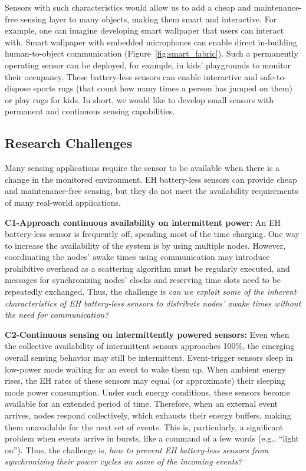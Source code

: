 Sensors with such characteristics would allow us to add a cheap and maintenance-free sensing layer to many objects, making them smart and interactive. For example, one can imagine developing smart wallpaper that users can interact with. 
Smart wallpaper with embedded microphones can enable direct in-building human-to-object communication (Figure~\ref{fig:smart_fabric}). Such a permanently operating sensor can be deployed, for example, in kids' playgrounds to monitor their occupancy. These battery-less sensors can enable
interactive and safe-to-dispose sports rugs (that count how many times a person has jumped on them) or play rugs for kids.
In short, we would like to develop small sensors with permanent and continuous sensing capabilities.  
%
\subsection{Research Challenges}
Many sensing applications require the sensor to be available when there is a change in the monitored environment.
EH battery-less sensors can provide cheap and maintenance-free sensing, but they do not meet the availability requirements of many real-world applications. 

\noindent\textbf{C1-Approach continuous availability on intermittent power}: 
An EH battery-less sensor is frequently off, spending most of the time charging. One way to increase the availability of the system is by using multiple nodes.
However, coordinating the nodes' awake times using communication may introduce prohibitive overhead as a scattering algorithm must be regularly executed, and messages for synchronizing nodes' clocks and reserving time slots need to be repeatedly exchanged.
Thus, the challenge is \emph{can we exploit some of the inherent characteristics of EH battery-less sensors to distribute nodes' awake times without the need for communication?}

\noindent\textbf{C2-Continuous sensing on intermittently powered sensors:}  
Even when the collective availability of intermittent sensors approaches 100\%, the emerging overall sensing behavior may still be intermittent. 
Event-trigger sensors sleep in low-power mode waiting for an event to wake them up. 
When ambient energy rises, the EH rates of these sensors may equal (or approximate) their sleeping mode power consumption.
Under such energy conditions, these sensors become available for an extended period of time. 
Therefore, when an external event arrives, nodes respond collectively, which exhausts their energy buffers, making them unavailable for the next set of events. 
This is, particularly, a significant problem when events arrive in bursts, like a command of a few words (e.g., ``light on''). 
Thus, the challenge is, \emph{how to prevent EH battery-less sensors from synchronizing their power cycles on some of the incoming events?}

